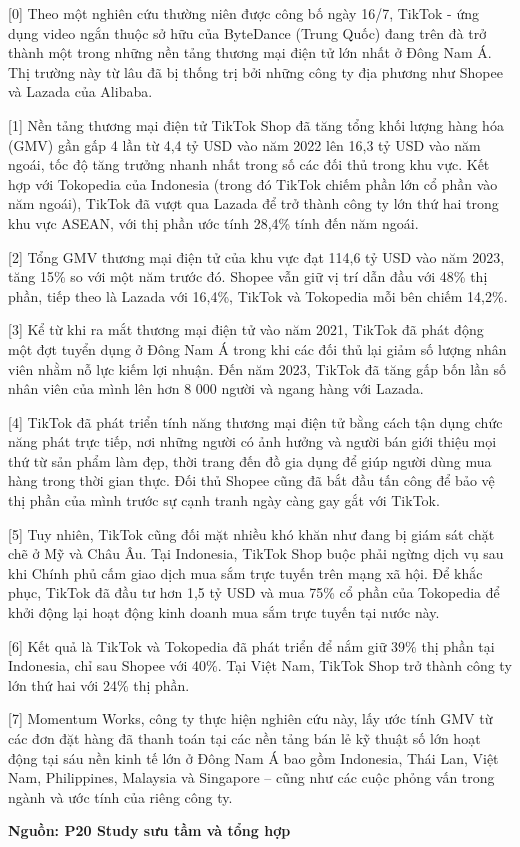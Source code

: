 \documentclass[12pt,a4paper,twoside]{article}
\newenvironment{readingpassage}[1][]{%
    \begin{tcolorbox}[enhanced, colback=grayLight, colframe=secondaryBlue,
        coltitle=textDark, fonttitle=\bfseries, title={#1},
        rounded corners, arc=3mm, boxrule=1pt,
        left=15pt, right=15pt, top=10pt, bottom=10pt,
        breakable, before skip=10pt, after skip=10pt, drop fuzzy shadow]
    \setstretch{1.3}
}{\end{tcolorbox}}
\begin{document}
\begin{readingpassage}[]
[0] Theo một nghiên cứu thường niên được công bố ngày 16/7, TikTok - ứng dụng video ngắn thuộc sở hữu của ByteDance (Trung Quốc) đang trên đà trở thành một trong những nền tảng thương mại điện tử lớn nhất ở Đông Nam Á. Thị trường này từ lâu đã bị thống trị bởi những công ty địa phương như Shopee và Lazada của Alibaba.

[1] Nền tảng thương mại điện tử TikTok Shop đã tăng tổng khối lượng hàng hóa (GMV) gần gấp 4 lần từ 4,4 tỷ USD vào năm 2022 lên 16,3 tỷ USD vào năm ngoái, tốc độ tăng trưởng nhanh nhất trong số các đối thủ trong khu vực. Kết hợp với Tokopedia của Indonesia (trong đó TikTok chiếm phần lớn cổ phần vào năm ngoái), TikTok đã vượt qua Lazada để trở thành công ty lớn thứ hai trong khu vực ASEAN, với thị phần ước tính 28,4\% tính đến năm ngoái.

[2] Tổng GMV thương mại điện tử của khu vực đạt 114,6 tỷ USD vào năm 2023, tăng 15\% so với một năm trước đó. Shopee vẫn giữ vị trí dẫn đầu với 48\% thị phần, tiếp theo là Lazada với 16,4\%, TikTok và Tokopedia mỗi bên chiếm 14,2\%.

[3] Kể từ khi ra mắt thương mại điện tử vào năm 2021, TikTok đã phát động một đợt tuyển dụng ở Đông Nam Á trong khi các đối thủ lại giảm số lượng nhân viên nhằm nỗ lực kiếm lợi nhuận. Đến năm 2023, TikTok đã tăng gấp bốn lần số nhân viên của mình lên hơn 8 000 người và ngang hàng với Lazada.

[4] TikTok đã phát triển tính năng thương mại điện tử bằng cách tận dụng chức năng phát trực tiếp, nơi những người có ảnh hưởng và người bán giới thiệu mọi thứ từ sản phẩm làm đẹp, thời trang đến đồ gia dụng để giúp người dùng mua hàng trong thời gian thực. Đối thủ Shopee cũng đã bắt đầu tấn công để bảo vệ thị phần của mình trước sự cạnh tranh ngày càng gay gắt với TikTok.

[5] Tuy nhiên, TikTok cũng đối mặt nhiều khó khăn như đang bị giám sát chặt chẽ ở Mỹ và Châu Âu. Tại Indonesia, TikTok Shop buộc phải ngừng dịch vụ sau khi Chính phủ cấm giao dịch mua sắm trực tuyến trên mạng xã hội. Để khắc phục, TikTok đã đầu tư hơn 1,5 tỷ USD và mua 75\% cổ phần của Tokopedia để khởi động lại hoạt động kinh doanh mua sắm trực tuyến tại nước này.

[6] Kết quả là TikTok và Tokopedia đã phát triển để nắm giữ 39\% thị phần tại Indonesia, chỉ sau Shopee với 40\%. Tại Việt Nam, TikTok Shop trở thành công ty lớn thứ hai với 24\% thị phần.

[7] Momentum Works, công ty thực hiện nghiên cứu này, lấy ước tính GMV từ các đơn đặt hàng đã thanh toán tại các nền tảng bán lẻ kỹ thuật số lớn hoạt động tại sáu nền kinh tế lớn ở Đông Nam Á bao gồm Indonesia, Thái Lan, Việt Nam, Philippines, Malaysia và Singapore -- cũng như các cuộc phỏng vấn trong ngành và ước tính của riêng công ty.

\hfill \textbf{Nguồn: P20 Study sưu tầm và tổng hợp}
\end{readingpassage}
\end{document}
